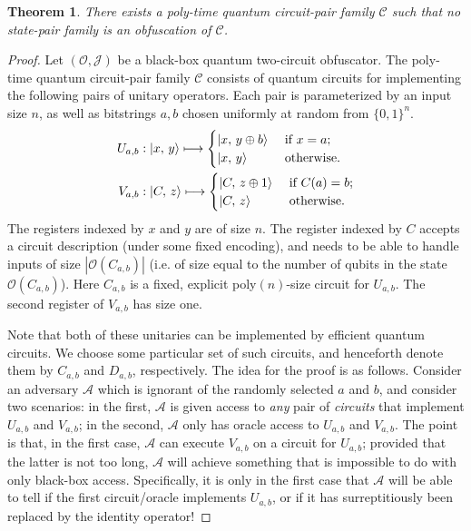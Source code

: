 \documentclass[11pt]{article}
\numberwithin{equation}{section}
\newtheorem{theorem}{Theorem}
\newcommand{\algo}{\mathcal}
\begin{document}
{\begin{theorem}
There exists a poly-time quantum circuit-pair family $\mathcal C$ such that no state-pair family is an obfuscation of $\mathcal C$.
\end{theorem}
\begin{proof}
Let $(\mathcal O, \mathcal J)$ be a black-box quantum two-circuit obfuscator. 
The poly-time quantum circuit-pair family $\mathcal C$ consists of quantum circuits for implementing the following pairs of unitary operators. Each pair is parameterized by an input size $n$, as well as bitstrings $a, b$ chosen uniformly at random from $\{0, 1\}^n$.
\begin{align}\label{eq:pair-impossible}
U_{a, b} &: {\left\vert{x,\, y}\right\rangle} \longmapsto
\begin{cases}
{\left\vert{x,\, y \oplus b}\right\rangle} &\text{ if } x = a;\\
{\left\vert{x,\, y}\right\rangle} &\text{ otherwise}.
\end{cases}\\
V_{a, b} &: {\left\vert{C,\, z}\right\rangle} \longmapsto
\begin{cases}
{\left\vert{C,\, z \oplus 1}\right\rangle} &\text{ if } C(a) = b;\\
{\left\vert{C,\, z}\right\rangle} &\text{ otherwise}.
\end{cases}
\end{align}
The registers indexed by $x$ and $y$ are of size $n$. The register indexed by $C$ accepts a circuit description (under some fixed encoding), and needs to be able to handle inputs of size $|\algo O(C_{a, b})|$ (i.e. of size equal to the number of qubits in the state $\algo O(C_{a, b})$). Here $C_{a, b}$ is a fixed, explicit poly$(n)$-size circuit for $U_{a, b}$. The second register of $V_{a, b}$ has size one. 

Note that both of these unitaries can be implemented by efficient quantum circuits. We choose some particular set of such circuits, and henceforth denote them by $C_{a,b}$ and $D_{a,b}$, respectively. The idea for the proof is as follows. Consider an adversary $\algo A$ which is ignorant of the randomly selected $a$ and $b$, and consider two scenarios: in the first, $\algo A$ is given access to \emph{any} pair of \emph{circuits} that implement $U_{a, b}$ and $V_{a, b}$; in the second, $\algo A$ only has oracle access to $U_{a, b}$ and $V_{a, b}$. The point is that, in the first case, $\algo A$ can execute $V_{a, b}$ on a circuit for $U_{a, b}$; provided that the latter is not too long, $\algo A$ will achieve something that is impossible to do with only black-box access. Specifically, it is only in the first case that $\algo A$ will be able to tell if the first circuit/oracle implements $U_{a, b}$, or if it has surreptitiously been replaced by the identity operator!


\end{proof}}
\end{document}
